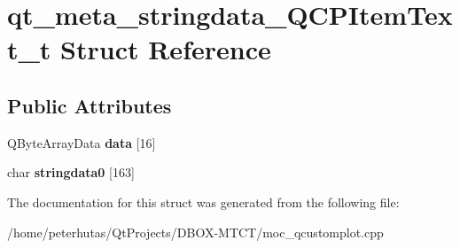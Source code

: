 \hypertarget{structqt__meta__stringdata___q_c_p_item_text__t}{}\section{qt\+\_\+meta\+\_\+stringdata\+\_\+\+Q\+C\+P\+Item\+Text\+\_\+t Struct Reference}
\label{structqt__meta__stringdata___q_c_p_item_text__t}
\subsection*{Public Attributes}
\begin{DoxyCompactItemize}
\item 
\mbox{\label{structqt__meta__stringdata___q_c_p_item_text__t_a130c44d0975b8c3615445811c48edcab}} 
Q\+Byte\+Array\+Data {\bfseries data} \mbox{[}16\mbox{]}
\item 
\mbox{\label{structqt__meta__stringdata___q_c_p_item_text__t_ab2e92c59ac0dced63f1fc1f4cc75cbc7}} 
char {\bfseries stringdata0} \mbox{[}163\mbox{]}
\end{DoxyCompactItemize}


The documentation for this struct was generated from the following file\+:\begin{DoxyCompactItemize}
\item 
/home/peterhutas/\+Qt\+Projects/\+D\+B\+O\+X-\/\+M\+T\+C\+T/moc\+\_\+qcustomplot.\+cpp\end{DoxyCompactItemize}
